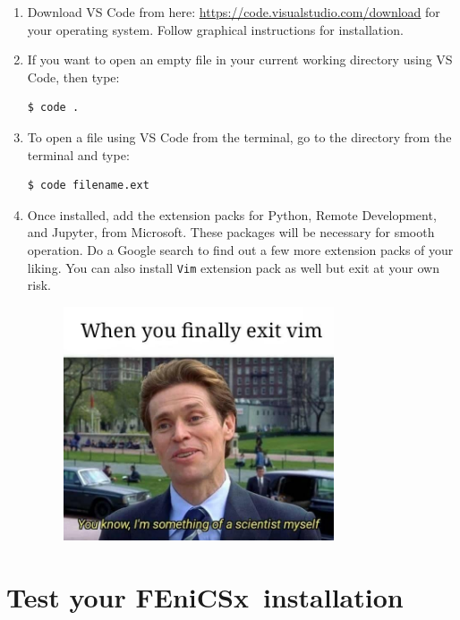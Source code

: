 \documentclass[12pt]{article}
\newcommand{\fenicsx}{\textsf{FEniCSx}}
\begin{document}
\begin{enumerate}[label={\arabic*.}, leftmargin= 0.6 cm,itemsep = 0.25cm,topsep= .25cm]

\item Download VS Code from here: \url{https://code.visualstudio.com/download} for your operating system. Follow graphical instructions for installation.

\item If you want to open an empty file in your current working directory using VS Code, then type:

\begin{lstlisting}[style=terminal]
$ code .
\end{lstlisting}

\item To open a file using VS Code from the terminal, go to the directory from the terminal and type:

\begin{lstlisting}[style=terminal]
$ code filename.ext
\end{lstlisting}

\item Once installed, add the extension packs for Python, Remote Development, and Jupyter, from Microsoft. These packages will be necessary for smooth operation. Do a Google search to find out a few more extension packs of your liking. You can also install \texttt{Vim} extension pack as well but exit at your own risk.

\begin{figure}[H]
    \centering
    \includegraphics[width=8cm]{vim_exit.jpeg}
\end{figure}

\end{enumerate}

\section*{Test your \fenicsx \ installation}
\end{document}
